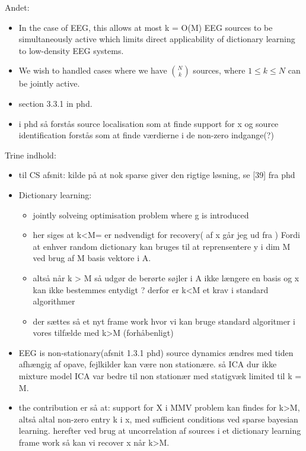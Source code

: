 Andet:
\begin{itemize}
\item In the case of EEG, this allows at most k = O(M) EEG sources to be simultaneously active which limits direct applicability of dictionary learning to low-density EEG systems.
\item We wish to handled cases where we have $\binom{N}{k}$ sources, where $1 \leq k \leq N$ can be jointly active.
\item section 3.3.1 in phd.
\item i phd så forstås source localisation som at finde support for x og source identification forstås som at finde værdierne i de non-zero indgange(?)

\end{itemize}

Trine indhold:
\begin{itemize}
\item til CS afsnit: kilde på at nok sparse giver den rigtige løsning, se [39] fra phd
\item Dictionary learning:
\begin{itemize}
\item jointly solveing optimisation problem where g is introduced
\item her siges at k<M= er nødvendigt for recovery( af x går jeg ud fra ) Fordi at enhver random dictionary kan bruges til at reprensentere y i dim M ved brug af M basis vektore i A.
\item altså når k > M så udgør de berørte søjler i A ikke længere en basis og x kan ikke bestemmes entydigt ? derfor er k<M et krav i standard algorithmer
\item der sættes så et nyt frame work hvor vi kan bruge standard algoritmer i vores tilfælde med k>M (forhåbenligt) 
\end{itemize}
\item EEG is non-stationary(afsnit 1.3.1 phd) source dynamics ændres med tiden afhængig af opave, fejlkilder kan være non stationære. så ICA dur ikke mixture model ICA var bedre til non stationær med statigvæk limited til k = M. 
\item the contribution er så at: support for X i MMV problem kan findes for k>M, altså altal non-zero entry k i x, med sufficient conditions ved sparse bayesian learning. herefter ved brug at uncorrelation af sources i et dictionary learning frame work så kan vi recover x når k>M. 
\end{itemize}  
  















